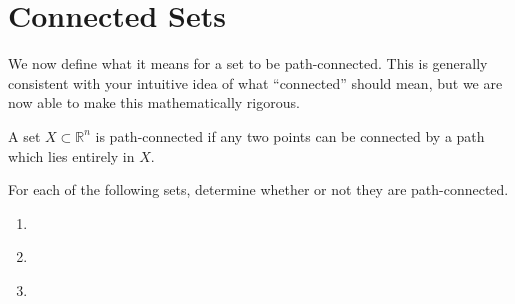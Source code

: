 \documentclass{ximera}
\begin{document}
\section{Connected Sets}

We now define what it means for a set to be path-connected. This is generally consistent with your intuitive idea of what ``connected'' should mean, but we are now able to make this mathematically rigorous.

\begin{definition}
A set $X\subset \mathbb{R}^n$ is path-connected if any two points can be connected by a path which lies entirely in $X$.
\end{definition}

\begin{problem}

For each of the following sets, determine whether or not they are path-connected.
\begin{enumerate}

\item \begin{image}\end{image}
\begin{multipleChoice}
\end{multipleChoice}

\item \begin{image}\end{image}
\begin{multipleChoice}
\end{multipleChoice}

\item \begin{image}\end{image}
\begin{multipleChoice}
\end{multipleChoice}

\end{enumerate}
\end{problem}
\end{document}
